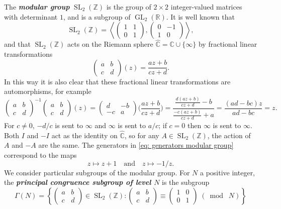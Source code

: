 \documentclass[11pt,leqno]{article}
\newcommand{\cbr}[1]{\left\{#1\right\}}
\newcommand{\textib}[1]{\textbf{\textit{#1}}}
\DeclareMathOperator{\GL}{GL}
\DeclareMathOperator{\SL}{SL}
\newcommand{\smod}[1]{\;(\bmod\; #1)}
\begin{document}
The \textib{modular group} $\SL_2(\mathbb{Z})$ is the group of $2\times 2$ integer-valued matrices with determinant $1$, and is a subgroup of $\GL_2(\mathbb{R})$. It is well known that 
\begin{equation}\label{eq: generators modular group}
    \SL_2(\mathbb{Z}) = \left\langle\begin{pmatrix}
        1 & 1 \\ 0 & 1
    \end{pmatrix}, \begin{pmatrix}
        0 & -1 \\ 1 & 0
    \end{pmatrix}\right\rangle, 
\end{equation}
and that $\SL_2(\mathbb{Z})$ acts on the Riemann sphere $\widehat{\mathbb{C}} = \mathbb{C}\cup \{\infty\}$ by fractional linear transformations
\[\begin{pmatrix}
    a & b \\ c & d
\end{pmatrix}(z) = \frac{az + b}{cz + d}.\] In this way it is also clear that these fractional linear transformations are automorphisms, for example \[\begin{pmatrix}
    a & b \\ c & d
\end{pmatrix}^{-1}\begin{pmatrix}
    a & b \\ c & d
\end{pmatrix}(z) = \begin{pmatrix}
    d & -b \\ -c & a
\end{pmatrix}\bigg(\frac{az+b}{cz+d}\bigg) = \frac{\frac{d(az+b)}{cz+d}- b}{\frac{-c(az+b)}{cz+d}+a} = \frac{(ad-bc)z}{ad-bc} = z.\] For $c\neq 0$, $-d/c$ is sent to $\infty$ and $\infty$ is sent to $a/c$; if $c = 0$ then $\infty$ is sent to $\infty$. Both $I$ and $-I$ act as the identity on $\widehat{\mathbb{C}}$, so for any $A\in \SL_2(\mathbb{Z})$, the action of $A$ and $-A$ are the same. The generators in \cref{eq: generators modular group} correspond to the maps
\[z\mapsto z+1\quad\text{and}\quad z\mapsto -1/z.\]
We consider particular subgroups of the modular group. For $N$ a positive integer, the \textib{principal congruence subgroup of level $N$} is the subgroup
\[\Gamma(N) = \cbr{\begin{pmatrix}
    a & b \\ c & d
\end{pmatrix}\in \SL_2(\mathbb{Z})\colon \begin{pmatrix}
    a & b \\ c & d
\end{pmatrix}\equiv \begin{pmatrix}
    1 & 0 \\ 0 & 1
\end{pmatrix}\smod N}\]
\end{document}
